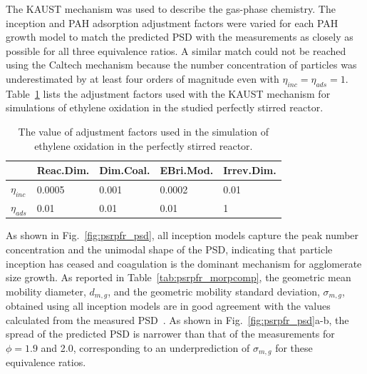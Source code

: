 The KAUST mechanism was used to describe the gas-phase chemistry. The inception and PAH adsorption adjustment factors were varied for each PAH growth model to match the predicted PSD with the measurements as closely as possible for all three equivalence ratios. A similar match could not be reached using the Caltech mechanism because the number concentration of particles was underestimated by at least four orders of magnitude even with $\eta_{inc}=\eta_{ads}=1$. Table~\ref{tab:adjustfactor_psr} lists the adjustment factors used with the KAUST mechanism for simulations of ethylene oxidation in the studied perfectly stirred reactor.

\begin{table}[!t]
	\caption{The value of adjustment factors used in the simulation of ethylene oxidation in the perfectly stirred reactor.}
	\label{tab:adjustfactor_psr}
	\centering
	\begin{tabular}{lllll}
		\hline
		& Reac.Dim. & Dim.Coal. & EBri.Mod. & Irrev.Dim. \\
		\hline
		$\eta_{inc}$ & 0.0005     & 0.001      & 0.0002       & 0.01        \\
		$\eta_{ads}$ & 0.01      & 0.01      & 0.01       & 1 \\
		\hline       
	\end{tabular}
\end{table}

As shown in Fig.~\ref{fig:psrpfr_psd}, all inception models capture the peak number concentration and the unimodal shape of the PSD, indicating that particle inception has ceased and coagulation is the dominant mechanism for agglomerate size growth. As reported in Table~\ref{tab:psrpfr_morpcomp}, the geometric mean mobility diameter, $d_{m,g}$, and the geometric mobility standard deviation, $\sigma_{m,g}$, obtained using all inception models are in good agreement with the values calculated from the measured PSD~\citep{manzello2007soot}. As shown in Fig.~\ref{fig:psrpfr_psd}a-b, the spread of the predicted PSD is narrower than that of the measurements for $\phi = 1.9$ and 2.0, corresponding to an underprediction of $\sigma_{m,g}$ for these equivalence ratios.

